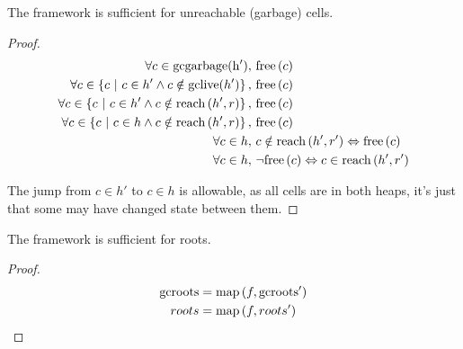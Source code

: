 \begin{lemma}
  The framework is sufficient for unreachable (garbage) cells.
\end{lemma}

\begin{proof}
  \begin{align*}
    \forall c \in \mathrm{gcgarbage(h')},\ & \mathrm{free}\left(c\right)\\
    \forall c \in \left\{c~|~c \in h' \land c \notin
      \mathrm{gclive}(h')\right\},\ & \mathrm{free}\left(c\right)\\
    \forall c \in \left\{c~|~c \in h' \land c \notin
      \mathrm{reach}\left(h', r\right)\right\},\ & \mathrm{free}\left(c\right)\\
    \forall c \in \left\{c~|~c \in h \land c \notin
      \mathrm{reach}\left(h', r\right)\right\},\ & \mathrm{free}\left(c\right)\\
    \forall c \in h,\ & c \notin \mathrm{reach}\left(h', r'\right) \Leftrightarrow \mathrm{free}\left(c\right)\\
    \forall c \in h,\ & \lnot\mathrm{free}\left(c\right) \Leftrightarrow c \in \mathrm{reach}\left(h', r'\right)
  \end{align*}

  The jump from $c \in h'$ to $c \in h$ is allowable, as all cells are
  in both heaps, it's just that some may have changed state between
  them.
\end{proof}

\begin{lemma}[Roots]
  The framework is sufficient for roots.
\end{lemma}

\begin{proof}
  \begin{align*}
    \mathrm{gcroots} &= \mathrm{map}\left(f, \mathrm{gcroots'}\right)\\
    roots &= \mathrm{map}\left(f, roots'\right)
  \end{align*}
\end{proof}
